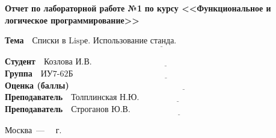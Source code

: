 \begin{titlepage}
	
	\begin{center}
		\Large\textbf{Отчет по лабораторной работе №1}
		\Large\textbf{по курсу <<Функциональное и логическое программирование>>}
	\end{center}


	\noindent\textbf{Тема} $\underline{\text{~~Списки в Lispе. Использование станда.~~~~~~~~~~~~~~~~~~~~~~~~~~~~~~~~~~~~~~~~~~~}}$\newline\newline\newline


	\noindent\textbf{Студент} $\underline{\text{~~Козлова И.В.~~~~~~~~~~~~~~~~~~~~~~~~~~~~~~~~~~~~~~~~~~~~~~~~~~~~~~~~~~~~~~~~~~~~~~~~}}$\newline\newline
	\noindent\textbf{Группа} $\underline{\text{~~ИУ7-62Б~~~~~~~~~~~~~~~~~~~~~~~~~~~~~~~~~~~~~~~~~~~~~~~~~~~~~~~~~~~~~~~~~~~~~~~~~~~~~~~~}}$\newline\newline
	\noindent\textbf{Оценка (баллы)} $\underline{\text{~~~~~~~~~~~~~~~~~~~~~~~~~~~~~~~~~~~~~~~~~~~~~~~~~~~~~~~~~~~~~~~~~~~~~~~~~~~~~~~~}}$\newline\newline
	\noindent\textbf{Преподаватель} $\underline{\text{~~Толплинская Н.Ю.~~~~~~~~~~~~~~~~~~~~~~~~~~~~~~~~~~~~~~~~~~~~~~~~~~~~~~}}$\newline\newline
	\noindent\textbf{Преподаватель} $\underline{\text{~~Строганов Ю.В.~~~~~~~~~~~~~~~~~~~~~~~~~~~~~~~~~~~~~~~~~~~~~~~~~~~~~~~~~~}}$\newline
	
	\begin{center}
		\vfill
		Москва~---~\the\year
		~г.
	\end{center}
	\restoregeometry
\end{titlepage}

